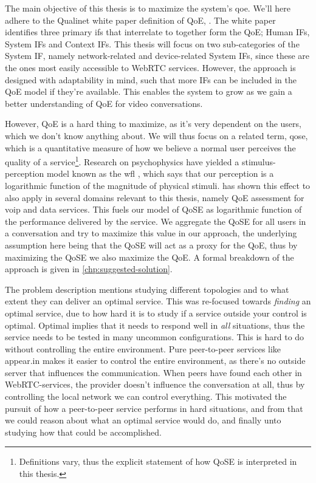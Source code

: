 The main objective of this thesis is to maximize the system's \gls{qoe}. We'll here adhere to the Qualinet white paper definition of QoE,  \cite{qualinet}. The white paper identifies three primary \glspl{if} that interrelate to together form the QoE; Human IFs, System IFs and Context IFs. This thesis will focus on two sub-categories of the System IF, namely network-related and device-related System IFs, since these are the ones most easily accessible to WebRTC services. However, the approach is designed with adaptability in mind, such that more IFs can be included in the QoE model if they're available. This enables the system to grow as we gain a better understanding of QoE for video conversations.

However, QoE is a hard thing to maximize, as it's very dependent on the users, which we don't know anything about. We will thus focus on a related term, \gls{qose}, which is a quantitative measure of how we believe a normal user perceives the quality of a service\footnote{Definitions vary, thus the explicit statement of how QoSE is interpreted in this thesis.}. Research on psychophysics have yielded a stimulus-perception model known as the \gls{wfl} \cite{wfl}, which says that our perception is a logarithmic function of the magnitude of physical stimuli. \cite{wfl-qoe} has shown this effect to also apply in several domains relevant to this thesis, namely QoE assessment for \gls{voip} and data services. This fuels our model of QoSE as logarithmic function of the performance delivered by the service. We aggregate the QoSE for all users in a conversation and try to maximize this value in our approach, the underlying assumption here being that the QoSE will act as a proxy for the QoE, thus by maximizing the QoSE we also maximize the QoE. A formal breakdown of the approach is given in \autoref{chp:suggested-solution}.


The problem description mentions studying different topologies and to what extent they can deliver an optimal service. This was re-focused towards \emph{finding} an optimal service, due to how hard it is to study if a service outside your control is optimal. Optimal implies that it needs to respond well in \emph{all} situations, thus the service needs to be tested in many uncommon configurations. This is hard to do without controlling the entire environment. Pure peer-to-peer services like appear.in makes it easier to control the entire environment, as there's no outside server that influences the communication. When peers have found each other in WebRTC-services, the provider doesn't influence the conversation at all, thus by controlling the local network we can control everything. This motivated the pursuit of how a peer-to-peer service performs in hard situations, and from that we could reason about what an optimal service would do, and finally unto studying how that could be accomplished.


